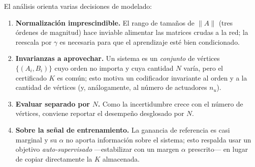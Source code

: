 El análisis orienta varias decisiones de modelado:
%
\begin{enumerate}
  \item \textbf{Normalización imprescindible.} El rango de tamaños de $\lVert
        A\rVert$ (tres órdenes de magnitud) hace inviable alimentar las matrices
        crudas a la red; la reescala por $\gamma$ es necesaria para que el
        aprendizaje esté bien condicionado.
  \item \textbf{Invarianzas a aprovechar.} Un sistema es un \emph{conjunto} de
        vértices $\{(A_i,B_i)\}$ cuyo orden no importa y cuya cantidad $N$ varía,
        pero el certificado $K$ es común; esto motiva un codificador invariante
        al orden y a la cantidad de vértices (y, análogamente, al número de
        actuadores $n_u$).
  \item \textbf{Evaluar separado por $N$.} Como la incertidumbre crece con el
        número de vértices, conviene reportar el desempeño desglosado por $N$.
  \item \textbf{Sobre la señal de entrenamiento.} La ganancia de referencia es
        casi marginal y su $\alpha$ no aporta información sobre el sistema; esto
        respalda usar un objetivo \emph{auto-supervisado} —estabilizar con un
        margen $\alpha$ prescrito— en lugar de copiar directamente la $K$
        almacenada.
\end{enumerate}

